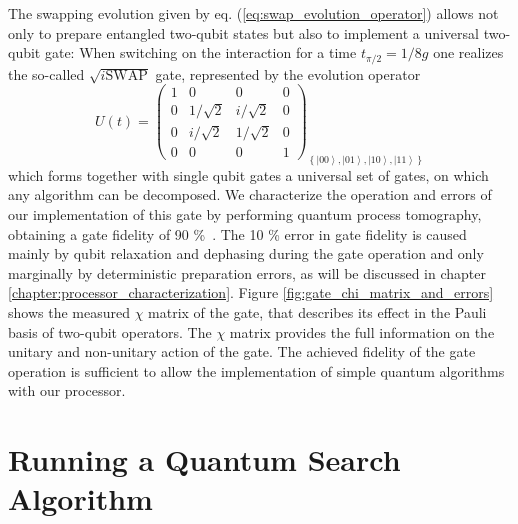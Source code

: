 The swapping evolution given by eq. (\ref{eq:swap_evolution_operator})
allows not only to prepare entangled two-qubit states but also to
implement a universal two-qubit gate:
When switching on the interaction for a time $t_{\pi/2}=1/8g$ one
realizes the so-called $\sqrt{i\mathrm{SWAP}}$ gate, represented
by the evolution operator
%
\begin{equation}
U(t)=\left(\begin{array}{cccc}
1 & 0 & 0 & 0\\
0 & 1/\sqrt{2} & i/\sqrt{2} & 0\\
0 & i/\sqrt{2} & 1/\sqrt{2} & 0\\
0 & 0 & 0 & 1\end{array}\right)_{\left\{ \left|00\right\rangle ,\left|01\right\rangle ,\left|10\right\rangle ,\left|11\right\rangle \right\} } \label{eq:sqrt_iswap_gate}
\end{equation}
%
which forms together with single qubit gates a universal set
of gates, on which any algorithm can be decomposed. We characterize
the operation and errors of our implementation of this gate by performing
quantum process tomography, obtaining a gate fidelity of 90 \%\ .
The 10 \% error in gate fidelity is caused mainly by qubit relaxation
and dephasing during the gate operation and only marginally by deterministic
preparation errors, as will be discussed in chapter \ref{chapter:processor_characterization}. Figure \ref{fig:gate_chi_matrix_and_errors}
shows the measured $\chi$ matrix of the gate, that describes its
effect in the Pauli basis of two-qubit operators. The $\chi$ matrix
provides the full information on the unitary and non-unitary action
of the gate. The achieved fidelity of the gate operation is sufficient
to allow the implementation of simple quantum algorithms with our
processor.


\section{Running a Quantum Search Algorithm}


